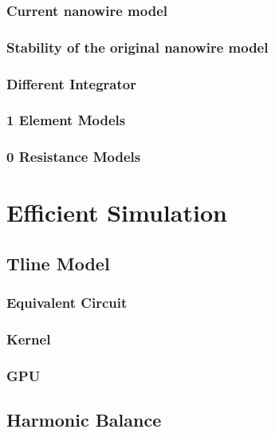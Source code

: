 \documentclass{article}
\begin{document}
\subsubsection{Current nanowire model}
\label{current_nw}


\subsubsection{Stability of the original nanowire model}

\subsubsection{Different Integrator}

\subsubsection{1 Element Models}

\subsubsection{0 Resistance Models}

\section{Efficient Simulation}


\subsection{Tline Model}

\subsubsection{Equivalent Circuit}

\subsubsection{Kernel}

\subsubsection{GPU}

\subsection{Harmonic Balance} \label{julia-sim-hb}
\end{document}
